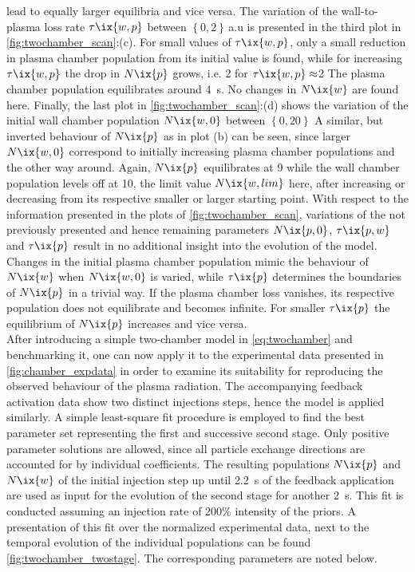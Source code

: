 lead to equally larger equilibria and vice versa. The variation of the wall-to-plasma loss rate $\tau\ix{w,p}$ between $\left\{0, 2\right\}$\,a.u is presented in the third plot in \cref{fig:twochamber_scan}:(c). For small values of $\tau\ix{w,p}$, only a small reduction in plasma chamber population from its initial value is found, while for increasing $\tau\ix{w,p}$ the drop in $N\ix{p}$ grows, i.e. \SI{2}{\arbitraryunit} for $\tau\ix{w,p}\approx$\SI{2}{\arbitraryunit} The plasma chamber population equilibrates around \SI{4}{\second}. No changes in $N\ix{w}$ are found here. Finally, the last plot in \cref{fig:twochamber_scan}:(d) shows the variation of the initial wall chamber population $N\ix{w,0}$ between $\left\{0, 20\right\}$\SI{}{\arbitraryunit} A similar, but inverted behaviour of $N\ix{p}$ as in plot (b) can be seen, since larger $N\ix{w,0}$ correspond to initially increasing plasma chamber populations and the other way around. Again, $N\ix{p}$ equilibrates at \SI{9}{\arbitraryunit} while the wall chamber population levels off at \SI{10}{\arbitraryunit}, the limit value $N\ix{w,lim}$ here, after increasing or decreasing from its respective smaller or larger starting point. With respect to the information presented in the plots of \cref{fig:twochamber_scan}, variations of the not previously presented and hence remaining parameters $N\ix{p,0}$, $\tau\ix{p,w}$ and $\tau\ix{p}$ result in no additional insight into the evolution of the model. Changes in the initial plasma chamber population mimic the behaviour of $N\ix{w}$ when $N\ix{w,0}$ is varied, while $\tau\ix{p}$ determines the boundaries of $N\ix{p}$ in a trivial way. If the plasma chamber loss vanishes, its respective population does not equilibrate and becomes infinite. For smaller $\tau\ix{p}$ the equilibrium of $N\ix{p}$ increases and vice versa.\\%
            After introducing a simple two-chamber model in \cref{eq:twochamber} and benchmarking it, one can now apply it to the experimental data presented in \cref{fig:chamber_expdata} in order to examine its suitability for reproducing the observed behaviour of the plasma radiation. The accompanying feedback activation data show two distinct injections steps, hence the model is applied similarly. A simple least-square fit procedure is employed to find the best parameter set representing the first and successive second stage. Only positive parameter solutions are allowed, since all particle exchange directions are accounted for by individual coefficients. The resulting populations $N\ix{p}$ and $N\ix{w}$ of the initial injection step up until \SI{2.2}{\second} of the feedback application are used as input for the evolution of the second stage for another \SI{2}{\second}. This fit is conducted assuming an injection rate of 200\% intensity of the priors. A presentation of this fit over the normalized experimental data, next to the temporal evolution of the individual populations can be found \cref{fig:twochamber_twostage}. The corresponding parameters are noted below.\\%
